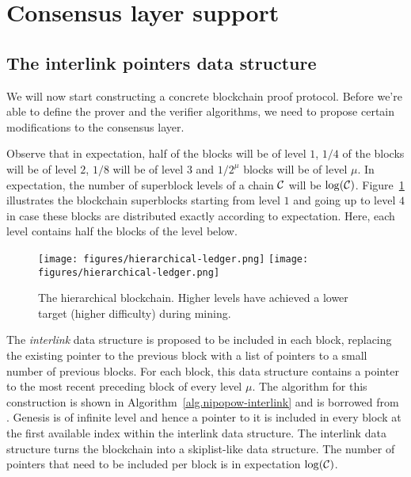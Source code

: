 \section{Consensus layer support} \label{sec.consensus}

\subsection{The interlink pointers data structure}
\label{sec.interlink}

We will now start constructing a concrete blockchain proof protocol. Before
we're able to define the prover and the verifier algorithms, we need to propose
certain modifications to the consensus layer.

Observe that in expectation, half of the blocks will be of level $1$, $1/4$
of the blocks will be of level $2$, $1/8$ will be of level $3$ and $1/2^\mu$
blocks will be of level $\mu$. In expectation, the number of superblock levels
of a chain $\mathcal{C}$ will be $\log(\mathcal{C})$. Figure~\ref{fig.hierarchy}
illustrates the blockchain superblocks starting from level $1$ and going up to
level $4$ in case these blocks are distributed exactly according to expectation.
Here, each level contains half the blocks of the level below.

\begin{figure}
    \caption{The hierarchical blockchain.
    Higher levels have achieved a lower target (higher difficulty) during mining.}
    \centering
    \iftwocolumn
        \texttt{[image: figures/hierarchical-ledger.png]}
    \else
        \texttt{[image: figures/hierarchical-ledger.png]}
    \fi
    \label{fig.hierarchy}
\end{figure}

The \textit{interlink} data structure is proposed to be included in each block,
replacing the existing pointer to the previous block with a list of pointers to
a small number of previous blocks. For each block, this data structure contains
a pointer to the most recent preceding block of every level $\mu$. The algorithm
for this construction is shown in Algorithm~\ref{alg.nipopow-interlink} and is
borrowed from \cite{KLS}. Genesis is of infinite level and hence a pointer to it
is included in every block at the first available index within the interlink
data structure. The interlink data structure turns the blockchain into a
skiplist-like data structure.  The number of pointers that need to be included
per block is in expectation $\log(\mathcal{C})$.

